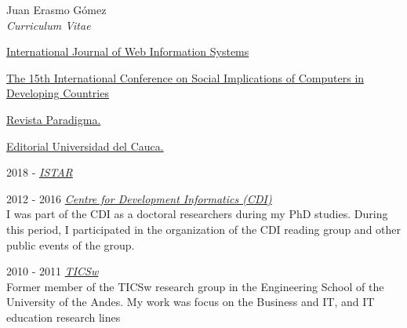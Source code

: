 \documentclass[10pt]{article}
\newenvironment{subbulletlist}{%
  \begin{list}{\labelitemii}{%
      \setlength{\topsep}{\itemsep}\setlength{\parskip}{\parsep}%
    }%
  }%
  { \end{list} }
\begin{document}
\begin{cv}{Juan Erasmo Gómez\\{\large \itshape Curriculum Vitae}}
\begin{cvlist}{}
  \end{cvlist}
  
  \begin{cvlist}{}
  \item \textbf{}
    \begin{subbulletlist}
    \item \href{https://www.emeraldgrouppublishing.com/journal/ijwis}{International Journal of Web Information Systems}
    \item \href{https://2019ifipwg94.net/}{The 15th International Conference on Social Implications of Computers in Developing Countries}
    \item \href{http://paradigma.uniandes.edu.co/}{Revista Paradigma.}
    \item \href{http://www.unicauca.edu.co/editorial/}{Editorial Universidad del Cauca.}
    \end{subbulletlist}
  \item \textbf{}

  \item[2018 - ] \textit{ \href{https://sophia.javeriana.edu.co/istar/}{ISTAR} }\\
    
  \item[2012 - 2016] \textit{\href{http://www.cdi.manchester.ac.uk/}{Centre for Development Informatics (CDI)}}\\
    {I was part of the CDI as a doctoral researchers during my PhD studies. During this period, I participated in the organization of the CDI reading group and other public events of the group.}

  \item[2010 - 2011] \textit{ \href{http://ticsw.uniandes.edu.co}{TICSw} }\\
      {Former member of the TICSw research group in the Engineering School of the University of the Andes. My work was focus on the Business and IT, and IT education research lines}


\end{cvlist}
\end{cv}
\end{document}
